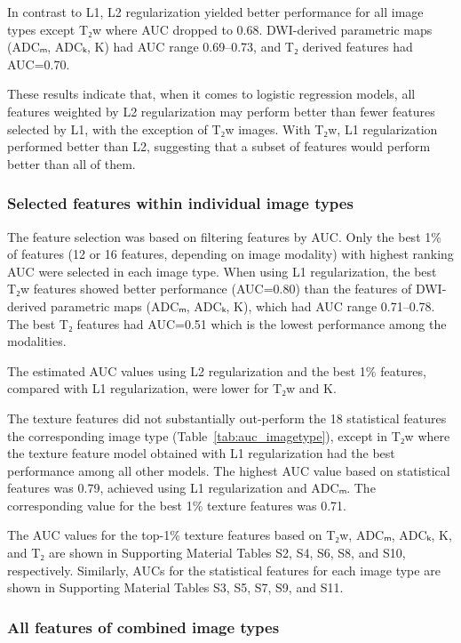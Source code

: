 \documentclass[10pt,letterpaper]{article}
\begin{document}
In contrast to L1, L2 regularization yielded better performance for all image
types except T₂w where AUC dropped to 0.68. DWI-derived parametric maps (ADCₘ,
ADCₖ, K) had AUC range 0.69--0.73, and T₂ derived features had AUC=0.70.

These results indicate that, when it comes to logistic regression models, all
features weighted by L2 regularization may perform better than fewer features
selected by L1, with the exception of T₂w images. With T₂w, L1 regularization
performed better than L2, suggesting that a subset of features would perform
better than all of them.


\subsubsection{Selected features within individual image types}

The feature selection was based on filtering features by AUC\@. Only the best
1\% of features (12 or 16 features, depending on image modality) with highest
ranking AUC were selected in each image type. When using L1 regularization, the
best T₂w features showed better performance (AUC=0.80) than the features of
DWI-derived parametric maps (ADCₘ, ADCₖ, K), which had AUC range 0.71--0.78. The
best T₂ features had AUC=0.51 which is the lowest performance among the
modalities.

The estimated AUC values using L2 regularization and the best 1\% features,
compared with L1 regularization, were lower for T₂w and K.

The texture features did not substantially out-perform the 18 statistical
features the corresponding image type (Table~\ref{tab:auc_imagetype}), except in
T₂w where the texture feature model obtained with L1 regularization had the best
performance among all other models. The highest AUC value based on statistical
features was 0.79, achieved using L1 regularization and ADCₘ. The corresponding
value for the best 1\% texture features was 0.71.

The AUC values for the top-1\% texture features based on T₂w, ADCₘ, ADCₖ, K,
and T₂ are shown in Supporting Material Tables S2, S4, S6, S8, and S10,
respectively. Similarly, AUCs for the statistical features for each image
type are shown in Supporting Material Tables S3, S5, S7, S9, and S11.


\subsubsection{All features of combined image types}
\end{document}
